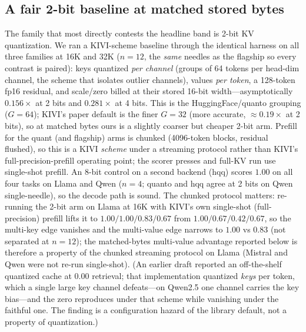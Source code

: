 \documentclass[11pt]{article}
\begin{document}
\subsection{A fair 2-bit baseline at matched stored bytes}
\label{sec:quantbaseline}
The family that most directly contests the headline band is 2-bit KV
quantization. We ran a KIVI-scheme baseline through the identical harness on
all three families at 16K and 32K ($n{=}12$, the \emph{same} needles as the
flagship so every contrast is paired): keys quantized \emph{per channel} (groups
of 64 tokens per head-dim channel, the scheme that isolates outlier channels),
values \emph{per token}, a 128-token fp16 residual, and scale/zero billed at their
stored 16-bit width---asymptotically $0.156\times$ at 2 bits and $0.281\times$ at
4 bits. This is the HuggingFace/quanto grouping ($G{=}64$); KIVI's paper default
is the finer $G{=}32$ (more accurate, $\approx0.19\times$ at 2 bits), so at matched
bytes ours is a slightly coarser but cheaper 2-bit arm. Prefill for the quant (and
flagship) arms is chunked (4096-token blocks, residual flushed), so this is a KIVI
\emph{scheme} under a streaming protocol rather than KIVI's full-precision-prefill
operating point; the scorer presses and full-KV run use single-shot prefill. An
8-bit control on a second backend (hqq) scores $1.00$ on all four tasks on Llama
and Qwen ($n{=}4$; quanto and hqq agree at 2 bits on Qwen single-needle), so the
decode path is sound. The chunked protocol matters: re-running the 2-bit arm on
Llama at 16K with KIVI's own single-shot (full-precision) prefill lifts it to
$1.00/1.00/0.83/0.67$ from $1.00/0.67/0.42/0.67$, so the multi-key edge vanishes and
the multi-value edge narrows to $1.00$ vs $0.83$ (not separated at $n{=}12$); the
matched-bytes multi-value advantage reported below is therefore a property of the
chunked streaming protocol on Llama (Mistral and Qwen were not re-run
single-shot). (An earlier draft
reported an off-the-shelf quantized cache at $0.00$ retrieval; that
implementation quantized \emph{keys} per token, which a single large key channel
defeats---on Qwen2.5 one channel carries the key bias---and the zero reproduces
under that scheme while vanishing under the faithful one. The finding is a
configuration hazard of the library default, not a property of quantization.)
\end{document}
